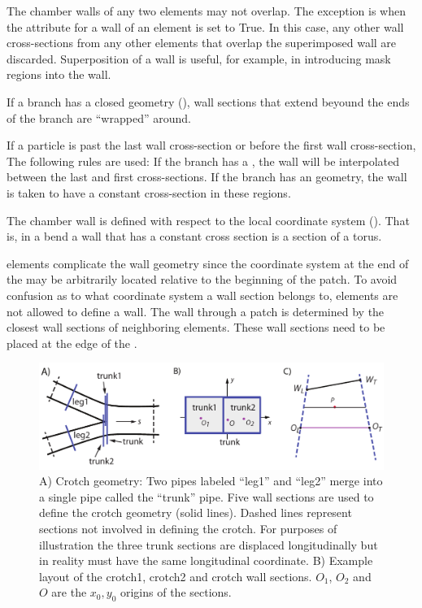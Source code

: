 The chamber walls of any two elements may not overlap. The exception
is when the  attribute for a wall of an element is set
to True. In this case, any other wall cross-sections from any other
elements that overlap the superimposed wall are discarded.
Superposition of a wall is useful, for example, in introducing mask
regions into the wall.

If a branch has a closed geometry (), wall sections that
extend beyound the ends of the branch are ``wrapped'' around.

If a particle is past the last wall cross-section or before the first
wall cross-section, The following rules are used: If the branch has a
, the wall will be interpolated between the last
and first cross-sections. If the branch has an  geometry, the
wall is taken to have a constant cross-section in these regions. 

The chamber wall is defined with respect to the local coordinate
system (). That is, in a bend a wall that has a constant
cross section is a section of a torus.

 elements complicate the wall geometry since the coordinate
system at the end of the  may be arbitrarily located
relative to the beginning of the patch. To avoid confusion as to what
coordinate system a wall section belongs to,  elements are
not allowed to define a wall. The wall through a patch is determined
by the closest wall sections of neighboring elements. These wall
sections need to be placed at the edge of the .


\begin{figure}[tb]
  \centering
  \includegraphics[width=6in]{crotch.pdf}
  \caption[vacuum chamber crotch geometry.]
{A) Crotch geometry: Two pipes labeled ``leg1'' and ``leg2'' merge
into a single pipe called the ``trunk'' pipe. Five wall sections are
used to define the crotch geometry (solid lines). Dashed lines
represent sections not involved in defining the crotch. For purposes
of illustration the three trunk sections are displaced longitudinally
but in reality must have the same longitudinal coordinate.  B) Example
layout of the crotch1, crotch2 and crotch wall sections. $O_1$, $O_2$
and $O$ are the $x_0, y_0$ origins of the sections.}
  \label{f:crotch}
\end{figure}

